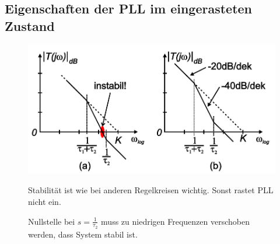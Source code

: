 \subsection{Eigenschaften der PLL im eingerasteten Zustand }
\begin{figure}[h!]
	\begin{minipage}{0.5\textwidth} 
       \includegraphics[width=1\textwidth]{images/PLL_Stabilitaet}
	\end{minipage}
	\begin{minipage}{0.4\textwidth} 
       \begin{compactitem}
          \item Stabilität ist wie bei anderen Regelkreisen wichtig. Sonst rastet PLL nicht ein.
          \item Nullstelle bei $s=\frac{1}{\tau_2}$ muss zu niedrigen Frequenzen verschoben werden, dass System stabil ist.
       \end{compactitem}
	\end{minipage}
\end{figure}

